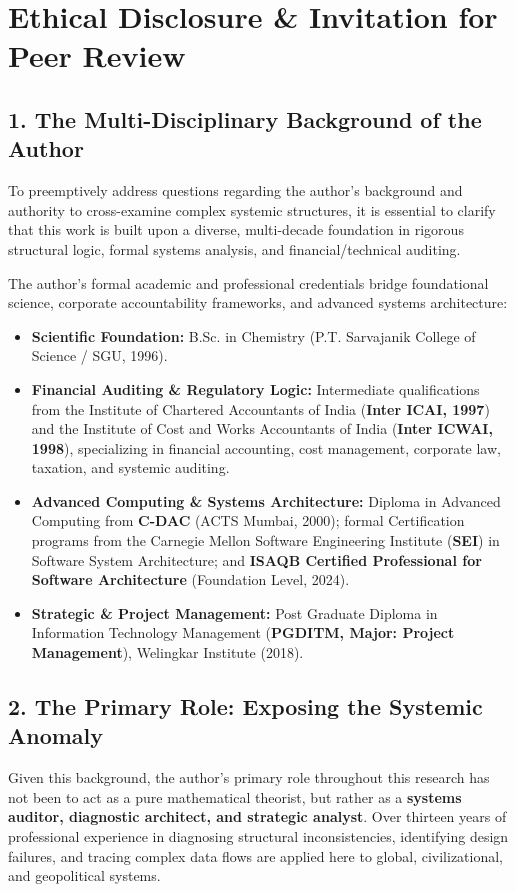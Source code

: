\section*{Ethical Disclosure \& Invitation for Peer Review}

\subsection*{1. The Multi-Disciplinary Background of the Author}
To preemptively address questions regarding the author's background and authority to cross-examine complex systemic structures, it is essential to clarify that this work is built upon a diverse, multi-decade foundation in rigorous structural logic, formal systems analysis, and financial/technical auditing. 

The author’s formal academic and professional credentials bridge foundational science, corporate accountability frameworks, and advanced systems architecture:
\begin{itemize}
	\item \textbf{Scientific Foundation:} B.Sc. in Chemistry (P.T. Sarvajanik College of Science / SGU, 1996).
	\item \textbf{Financial Auditing \& Regulatory Logic:} Intermediate qualifications from the Institute of Chartered Accountants of India (\textbf{Inter ICAI, 1997}) and the Institute of Cost and Works Accountants of India (\textbf{Inter ICWAI, 1998}), specializing in financial accounting, cost management, corporate law, taxation, and systemic auditing.
	\item \textbf{Advanced Computing \& Systems Architecture:} Diploma in Advanced Computing from \textbf{C-DAC} (ACTS Mumbai, 2000); formal Certification programs from the Carnegie Mellon Software Engineering Institute (\textbf{SEI}) in Software System Architecture; and \textbf{ISAQB Certified Professional for Software Architecture} (Foundation Level, 2024).
	\item \textbf{Strategic \& Project Management:} Post Graduate Diploma in Information Technology Management (\textbf{PGDITM, Major: Project Management}), Welingkar Institute (2018).
\end{itemize}

\subsection*{2. The Primary Role: Exposing the Systemic Anomaly}
Given this background, the author’s primary role throughout this research has not been to act as a pure mathematical theorist, but rather as a \textbf{systems auditor, diagnostic architect, and strategic analyst}. Over thirteen years of professional experience in diagnosing structural inconsistencies, identifying design failures, and tracing complex data flows are applied here to global, civilizational, and geopolitical systems. 

